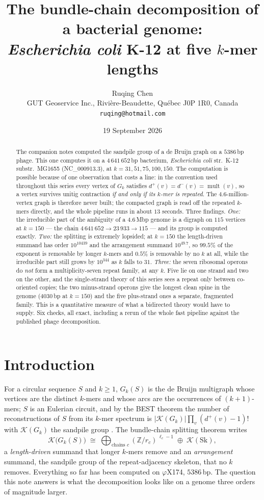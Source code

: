 \documentclass[11pt]{article}
\title{\bfseries The bundle-chain decomposition of a bacterial genome:\\
\emph{Escherichia coli} K-12 at five $k$-mer lengths}
\author{Ruqing Chen\\[2pt]
\normalsize GUT Geoservice Inc., Rivi\`ere-Beaudette, Qu\'ebec J0P 1R0, Canada\\
\normalsize\texttt{ruqing@hotmail.com}}
\date{19 September 2026}
\theoremstyle{plain}
\theoremstyle{definition}
\theoremstyle{remark}
\newcommand{\Z}{\mathbb{Z}}
\newcommand{\K}{\mathcal{K}}
\newcommand{\Sk}{\mathrm{Sk}}
\begin{document}
\maketitle

\begin{abstract}
\noindent
The companion notes computed the sandpile group of a de Bruijn graph on a $5386$\,bp
phage. This one computes it on a $4\,641\,652$\,bp bacterium, \emph{Escherichia coli}
str.\ K-12 substr.\ MG1655 (NC\_000913.3), at $k=31,51,75,100,150$. The computation is
possible because of one observation that costs a line: in the convention used throughout
this series every vertex of $G_k$ satisfies $d^{+}(v)=d^{-}(v)=\operatorname{mult}(v)$, so
a vertex survives unitig contraction \emph{if and only if its $k$-mer is repeated}. The
$4.6$-million-vertex graph is therefore never built; the compacted graph is read off the
repeated $k$-mers directly, and the whole pipeline runs in about $13$ seconds. Three
findings. \emph{One:} the irreducible part of the ambiguity of a $4.6$\,Mbp genome is a
digraph on $115$ vertices at $k=150$ --- the chain $4\,641\,652\to23\,933\to115$ --- and
its group is computed exactly. \emph{Two:} the splitting is extremely lopsided; at
$k=150$ the length-driven summand has order $10^{10439}$ and the arrangement summand
$10^{49.7}$, so $99.5\%$ of the exponent is removable by longer $k$-mers and $0.5\%$ is
removable by no $k$ at all, while the irreducible part still grows by $10^{344}$ as $k$
falls to $31$. \emph{Three:} the seven ribosomal operons do \emph{not} form a
multiplicity-seven repeat family, at any $k$. Five lie on one strand and two on the
other, and the single-strand theory of this series sees a repeat only between co-oriented
copies; the two minus-strand operons give the longest clean spine in the genome
($4030$\,bp at $k=150$) and the five plus-strand ones a separate, fragmented family. This
is a quantitative measure of what a bidirected theory would have to supply. Six checks,
all exact, including a rerun of the whole fast pipeline against the published phage
decomposition.
\end{abstract}

\section{Introduction}\label{sec:intro}

For a circular sequence $S$ and $k\ge1$, $G_k(S)$ is the de Bruijn multigraph whose
vertices are the distinct $k$-mers and whose arcs are the occurrences of $(k{+}1)$-mers;
$S$ is an Eulerian circuit, and by the BEST theorem the number of reconstructions of $S$
from its $k$-mer spectrum is $|\K(G_k)|\prod_v(d^{+}(v)-1)!$ with $\K(G_k)$ the sandpile
group \cite{Bio1}. The bundle-chain splitting theorem \cite{Bio3} writes
\[
\K\bigl(G_k(S)\bigr)\;\cong\;\bigoplus_{\text{chains }c}(\Z/r_c)^{\,\ell_c-1}
\;\oplus\;\K(\Sk),
\]
a \emph{length-driven} summand that longer $k$-mers remove and an \emph{arrangement}
summand, the sandpile group of the repeat-adjacency skeleton, that no $k$ removes.
Everything so far has been computed on $\varphi$X174, $5386$\,bp. The question this note
answers is what the decomposition looks like on a genome three orders of magnitude
larger.
\end{document}
